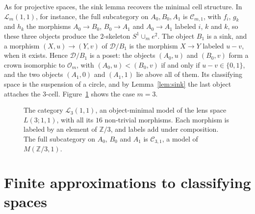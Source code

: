 \documentclass[12pt]{amsart}
\theoremstyle{definition}
\theoremstyle{remark}
\newcommand{\CC}{\mathcal{C}}
\newcommand{\DD}{\mathcal{D}}
\newcommand{\Z}{\mathbb{Z}}
\newcommand{\M}{M}
\begin{document}
As for projective spaces, the sink lemma recovers the minimal cell structure. In $\mathcal L_m(1,1)$, for instance, the full subcategory on $A_0,B_0,A_1$ is $\CC_{m,1}$, with $f_i$, $g_k$ and $h_k$ the morphisms $A_0\to B_0$, $B_0\to A_1$ and $A_0\to A_1$ labeled $i$, $k$ and $k$, so these three objects produce the $2$-skeleton $S^1\cup_me^2$. The object $B_1$ is a sink, and a morphism $(X,u)\to(Y,v)$ of $\DD/B_1$ is the morphism $X\to Y$ labeled $u-v$, when it exists. Hence $\DD/B_1$ is a poset: the objects $(A_0,u)$ and $(B_0,v)$ form a crown isomorphic to $\mathcal O_m$, with $(A_0,u)<(B_0,v)$ if and only if $u-v\in\{0,1\}$, and the two objects $(A_1,0)$ and $(A_1,1)$ lie above all of them. Its classifying space is the suspension of a circle, and by Lemma~\ref{lem:sink} the last object attaches the $3$-cell. Figure~\ref{fig:L31} shows the case $m=3$.

\begin{figure}[ht]
\centering
{}
\caption{The category $\mathcal L_3(1,1)$, an object-minimal model of the lens space $L(3;1,1)$, with all its $16$ non-trivial morphisms. Each morphism is labeled by an element of $\Z/3$, and labels add under composition. The full subcategory on $A_0$, $B_0$ and $A_1$ is $\CC_{3,1}$, a model of $\M(\Z/3,1)$.}
\label{fig:L31}
\end{figure}

\section{Finite approximations to classifying spaces}\label{sec:monoids}
\end{document}
